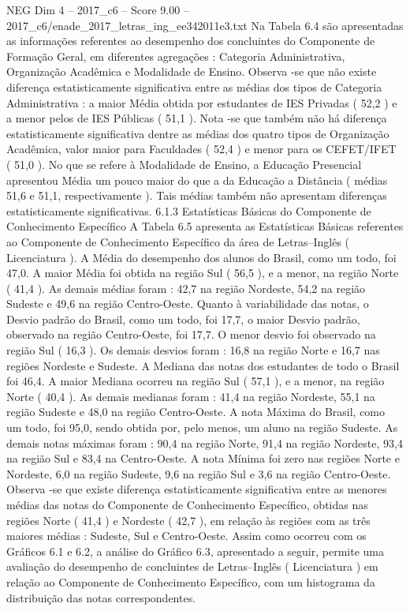 \begin{textsample}{NEG Dim 4 – 2017\_c6 – Score 9.00 – 2017\_c6/enade\_2017\_letras\_ing\_ee342011e3.txt}
Na Tabela 6.4 são apresentadas as informações referentes ao desempenho dos concluintes do Componente de Formação Geral, em diferentes agregações : Categoria Administrativa, Organização Acadêmica e Modalidade de Ensino.
Observa -se que não existe diferença estatisticamente significativa entre as médias dos tipos de Categoria Administrativa : a maior Média obtida por estudantes de IES Privadas ( 52,2 ) e a menor pelos de IES Públicas ( 51,1 ).
Nota -se que também não há diferença estatisticamente significativa dentre as médias dos quatro tipos de Organização Acadêmica, valor maior para Faculdades ( 52,4 ) e menor para os CEFET/IFET ( 51,0 ).
No que se refere à Modalidade de Ensino, a Educação Presencial apresentou Média um pouco maior do que a da Educação a Distância ( médias 51,6 e 51,1, respectivamente ).
Tais médias também não apresentam diferenças estatisticamente significativas. 6.1.3 Estatísticas Básicas do Componente de Conhecimento Específico A Tabela 6.5 apresenta as Estatísticas Básicas referentes ao Componente de Conhecimento Específico da área de Letras–Inglês ( Licenciatura ).
A Média do desempenho dos alunos do Brasil, como um todo, foi 47,0.
A maior Média foi obtida na região Sul ( 56,5 ), e a menor, na região Norte ( 41,4 ).
As demais médias foram : 42,7 na região Nordeste, 54,2 na região Sudeste e 49,6 na região Centro-Oeste.
Quanto à variabilidade das notas, o Desvio padrão do Brasil, como um todo, foi 17,7, o maior Desvio padrão, observado na região Centro-Oeste, foi 17,7.
O menor desvio foi observado na região Sul ( 16,3 ).
Os demais desvios foram : 16,8 na região Norte e 16,7 nas regiões Nordeste e Sudeste.
A Mediana das notas dos estudantes de todo o Brasil foi 46,4.
A maior Mediana ocorreu na região Sul ( 57,1 ), e a menor, na região Norte ( 40,4 ).
As demais medianas foram : 41,4 na região Nordeste, 55,1 na região Sudeste e 48,0 na região Centro-Oeste.
A nota Máxima do Brasil, como um todo, foi 95,0, sendo obtida por, pelo menos, um aluno na região Sudeste.
As demais notas máximas foram : 90,4 na região Norte, 91,4 na região Nordeste, 93,4 na região Sul e 83,4 na Centro-Oeste.
A nota Mínima foi zero nas regiões Norte e Nordeste, 6,0 na região Sudeste, 9,6 na região Sul e 3,6 na região Centro-Oeste.
Observa -se que existe diferença estatisticamente significativa entre as menores médias das notas do Componente de Conhecimento Específico, obtidas nas regiões Norte ( 41,4 ) e Nordeste ( 42,7 ), em relação às regiões com as três maiores médias : Sudeste, Sul e Centro-Oeste.
Assim como ocorreu com os Gráficos 6.1 e 6.2, a análise do Gráfico 6.3, apresentado a seguir, permite uma avaliação do desempenho de concluintes de Letras–Inglês ( Licenciatura ) em relação ao Componente de Conhecimento Específico, com um histograma da distribuição das notas correspondentes.

\end{textsample}
